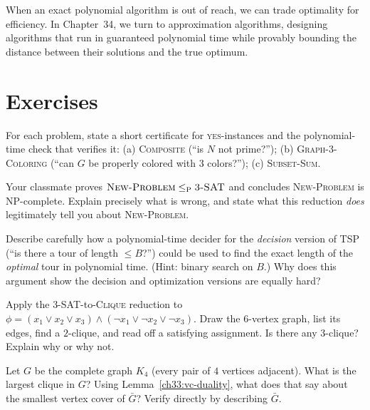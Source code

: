 When an exact polynomial algorithm is out of reach, we can trade optimality for efficiency. In Chapter~34, we turn to approximation algorithms, designing algorithms that run in guaranteed polynomial time while provably bounding the distance between their solutions and the true optimum.

\section{Exercises}

\begin{exercise}
For each problem, state a short certificate for \textsc{yes}-instances and the
polynomial-time check that verifies it: (a) \textsc{Composite} (``is $N$ not
prime?''); (b) \textsc{Graph-3-Coloring} (``can $G$ be properly colored with $3$
colors?''); (c) \textsc{Subset-Sum}.
\end{exercise}

\begin{exercise}
Your classmate proves $\textsc{New-Problem}\le_{\mathrm P}\textsc{3-SAT}$ and
concludes \textsc{New-Problem} is NP-complete. Explain precisely what is wrong,
and state what this reduction \emph{does} legitimately tell you about
\textsc{New-Problem}.
\end{exercise}

\begin{exercise}
Describe carefully how a polynomial-time decider for the \emph{decision} version
of \textsc{TSP} (``is there a tour of length $\le B$?'') could be used to find the
exact length of the \emph{optimal} tour in polynomial time. (Hint: binary search
on $B$.) Why does this argument show the decision and optimization versions are
equally hard?
\end{exercise}

\begin{exercise}
Apply the \textsc{3-SAT}-to-\textsc{Clique} reduction to
$\phi = (x_1\vee x_2\vee x_3)\wedge(\neg x_1\vee\neg x_2\vee\neg x_3)$. Draw the
$6$-vertex graph, list its edges, find a $2$-clique, and read off a satisfying
assignment. Is there any $3$-clique? Explain why or why not.
\end{exercise}

\begin{exercise}
Let $G$ be the complete graph $K_4$ (every pair of $4$ vertices adjacent). What is
the largest clique in $G$? Using Lemma~\ref{ch33:vc-duality}, what does that say
about the smallest vertex cover of $\bar G$? Verify directly by describing
$\bar G$.
\end{exercise}

